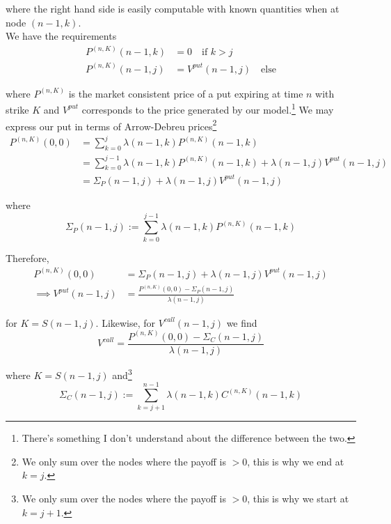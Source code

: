 \documentclass[12pt]{article}
\begin{document}
where the right hand side is easily computable with known quantities when at node $(n - 1, k)$. \\

We have the requirements
\begin{align*}
	P^{(n,K)}(n - 1, k) &= 0 \quad \text{if } k > j \\
	P^{(n,K)}(n - 1, j) &= V^{put}(n - 1, j) \quad \text{else}
\end{align*}

where $P^{(n,K)}$ is the market consistent price of a put expiring at time $n$ with strike $K$ and $V^{put}$ corresponds to the price generated by our model.\footnote{There's something I don't understand about the difference between the two.} We may express our put in terms of Arrow-Debreu prices\footnote{We only sum over the nodes where the payoff is $> 0$, this is why we end at $k = j$.}
\begin{align*}
	P^{(n,K)}(0,0) &= \sum^j_{k = 0} \lambda(n - 1, k) P^{(n,K)}(n - 1, k) \\
	&= \sum^{j - 1}_{k = 0} \lambda(n - 1, k)P^{(n, K)}(n - 1, k) + \lambda(n - 1, j)V^{put}(n - 1, j) \\
	&= \Sigma_P(n - 1, j) + \lambda(n - 1, j)V^{put}(n - 1, j)
\end{align*}

where
\begin{equation*}
	\Sigma_P(n - 1, j) := \sum^{j - 1}_{k = 0}\lambda(n - 1, k)P^{(n,K)}(n - 1, k)
\end{equation*}

Therefore,
\begin{align*}
	P^{(n,K)}(0,0) &= \Sigma_P(n - 1, j) + \lambda(n - 1, j)V^{put}(n - 1, j) \\
	\implies V^{put}(n - 1, j) &= \frac{ P^{(n,K)}(0,0) - \Sigma_P(n - 1, j) }{ \lambda(n - 1, j) }
\end{align*}

for $K = S(n - 1, j)$. Likewise, for $V^{call}(n - 1, j)$ we find
\begin{equation*}
	 V^{call} = \frac{ P^{(n,K)}(0,0) - \Sigma_C(n - 1, j) }{ \lambda(n - 1, j) }
\end{equation*}

where $K = S(n - 1, j)$ and\footnote{We only sum over the nodes where the payoff is $> 0$, this is why we start at $k = j + 1$.}
\begin{equation*}
	\Sigma_C(n - 1, j) := \sum^{n - 1}_{k = j + 1} \lambda(n - 1, k)C^{(n,K)}(n - 1, k)
\end{equation*}
\end{document}
